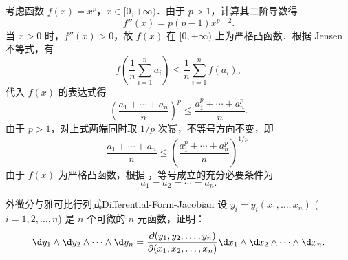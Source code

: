 \begin{myproof}
    考虑函数 $f(x) = x^p$，$x \in [0, +\infty)$．由于 $p > 1$，计算其二阶导数得
    \begin{equation}
        f''(x) = p(p-1)x^{p-2}. \label{eq:second-derivative}
    \end{equation}
    当 $x > 0$ 时，$f''(x) > 0$，故 $f(x)$ 在 $[0, +\infty)$ 上为严格凸函数．根据 Jensen 不等式，有
    \begin{equation}
        f\left( \frac{1}{n} \sum_{i=1}^{n} a_i \right) \le \frac{1}{n} \sum_{i=1}^{n} f(a_i), \label{eq:jensen-apply}
    \end{equation}
    代入 $f(x)$ 的表达式得
    \begin{equation}
        \left( \frac{a_1 + \cdots + a_n}{n} \right)^p \le \frac{a_1^p + \cdots + a_n^p}{n}.
    \end{equation}
    由于 $p > 1$，对上式两端同时取 $1/p$ 次幂，不等号方向不变，即
    \begin{equation}
        \frac{a_1 + \cdots + a_n}{n} \le \left( \frac{a_1^p + \cdots + a_n^p}{n} \right)^{1/p}.
    \end{equation}
    由于 $f(x)$ 为严格凸函数，根据 ，等号成立的充分必要条件为
    \begin{equation}
        \boxed{a_1 = a_2 = \cdots = a_n.}
    \end{equation}
\end{myproof}


\begin{problem}{外微分与雅可比行列式}{Differential-Form-Jacobian}
    设 $y_i = y_i(x_1, \dots, x_n)$ ($i = 1, 2, \dots, n$) 是 $n$ 个可微的 $n$ 元函数，证明：
    \begin{equation}
        \d y_1 \wedge \d y_2 \wedge \dots \wedge \d y_n = \frac{\partial(y_1, y_2, \dots, y_n)}{\partial(x_1, x_2, \dots, x_n)} \d x_1 \wedge \d x_2 \wedge \dots \wedge \d x_n.
    \end{equation}
\end{problem}

